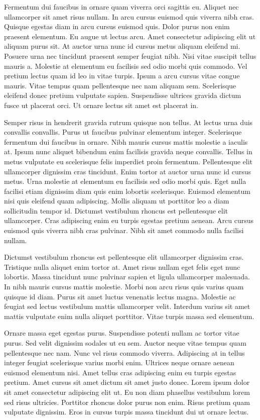 \documentclass[british, twocolumn]{tktltiki2}
\theoremstyle{definition}
\theoremstyle{remark}
\begin{document}
Fermentum dui faucibus in ornare quam viverra orci sagittis eu. Aliquet nec ullamcorper sit amet risus nullam. In arcu cursus euismod quis viverra nibh cras. Quisque egestas diam in arcu cursus euismod quis. Dolor purus non enim praesent elementum. Eu augue ut lectus arcu. Amet consectetur adipiscing elit ut aliquam purus sit. At auctor urna nunc id cursus metus aliquam eleifend mi. Posuere urna nec tincidunt praesent semper feugiat nibh. Nisi vitae suscipit tellus mauris a. Molestie at elementum eu facilisis sed odio morbi quis commodo. Vel pretium lectus quam id leo in vitae turpis. Ipsum a arcu cursus vitae congue mauris. Vitae tempus quam pellentesque nec nam aliquam sem. Scelerisque eleifend donec pretium vulputate sapien. Suspendisse ultrices gravida dictum fusce ut placerat orci. Ut ornare lectus sit amet est placerat in.

Semper risus in hendrerit gravida rutrum quisque non tellus. At lectus urna duis convallis convallis. Purus ut faucibus pulvinar elementum integer. Scelerisque fermentum dui faucibus in ornare. Nibh mauris cursus mattis molestie a iaculis at. Ipsum nunc aliquet bibendum enim facilisis gravida neque convallis. Tellus in metus vulputate eu scelerisque felis imperdiet proin fermentum. Pellentesque elit ullamcorper dignissim cras tincidunt. Enim tortor at auctor urna nunc id cursus metus. Urna molestie at elementum eu facilisis sed odio morbi quis. Eget nulla facilisi etiam dignissim diam quis enim lobortis scelerisque. Euismod elementum nisi quis eleifend quam adipiscing. Mollis aliquam ut porttitor leo a diam sollicitudin tempor id. Dictumst vestibulum rhoncus est pellentesque elit ullamcorper. Cras adipiscing enim eu turpis egestas pretium aenean. Arcu cursus euismod quis viverra nibh cras pulvinar. Nibh sit amet commodo nulla facilisi nullam.

Dictumst vestibulum rhoncus est pellentesque elit ullamcorper dignissim cras. Tristique nulla aliquet enim tortor at. Amet risus nullam eget felis eget nunc lobortis. Massa tincidunt nunc pulvinar sapien et ligula ullamcorper malesuada. In nibh mauris cursus mattis molestie. Morbi non arcu risus quis varius quam quisque id diam. Purus sit amet luctus venenatis lectus magna. Molestie ac feugiat sed lectus vestibulum mattis ullamcorper velit. Interdum varius sit amet mattis vulputate enim nulla aliquet porttitor. Vitae turpis massa sed elementum.

Ornare massa eget egestas purus. Suspendisse potenti nullam ac tortor vitae purus. Sed velit dignissim sodales ut eu sem. Auctor neque vitae tempus quam pellentesque nec nam. Nunc vel risus commodo viverra. Adipiscing at in tellus integer feugiat scelerisque varius morbi enim. Ultrices neque ornare aenean euismod elementum nisi. Amet tellus cras adipiscing enim eu turpis egestas pretium. Amet cursus sit amet dictum sit amet justo donec. Lorem ipsum dolor sit amet consectetur adipiscing elit ut. Eu non diam phasellus vestibulum lorem sed risus ultricies. Porttitor rhoncus dolor purus non enim. Risus pretium quam vulputate dignissim. Eros in cursus turpis massa tincidunt dui ut ornare lectus.
\end{document}

